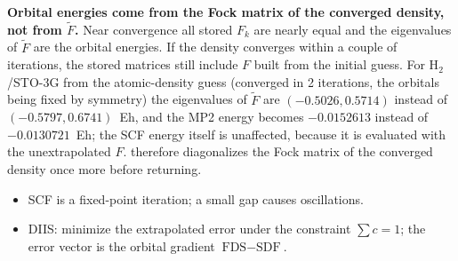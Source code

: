 \begin{pitfall}
\textbf{Orbital energies come from the Fock matrix of the converged density, not from $\tilde{F}$.} Near convergence all stored $F_k$ are nearly equal and the eigenvalues of $\tilde{F}$ are the orbital energies. If the density converges within a couple of iterations, the stored matrices still include $F$ built from the initial guess. For H$_2$/STO-3G from the atomic-density guess (converged in 2 iterations, the orbitals being fixed by symmetry) the eigenvalues of $\tilde{F}$ are $(-0.5026, 0.5714)$ instead of $(-0.5797, 0.6741)$~Eh, and the MP2 energy becomes $-0.0152613$ instead of $-0.0130721$~Eh; the SCF energy itself is unaffected, because it is evaluated with the unextrapolated $F$.  therefore diagonalizes the Fock matrix of the converged density once more before returning.
\end{pitfall}

\begin{summary}
\begin{itemize}
\item SCF is a fixed-point iteration; a small gap causes oscillations.
\item DIIS: minimize the extrapolated error under the constraint $\sum c = 1$; the error vector is the orbital gradient $\text{FDS} - \text{SDF}$.
\end{itemize}
\end{summary}
